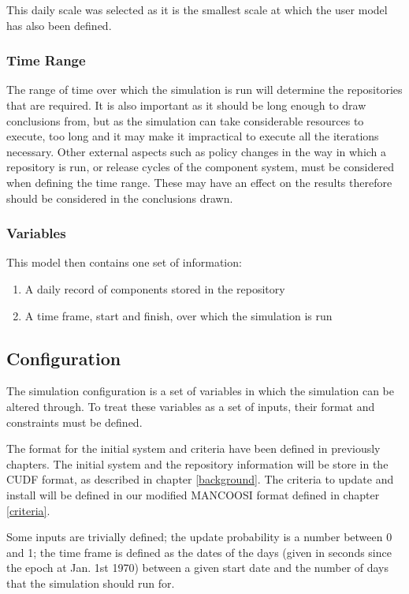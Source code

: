 This daily scale was selected as it is the smallest scale at which the user model has also been defined.

\subsubsection{Time Range}
The range of time over which the simulation is run will determine the repositories that are required.
It is also important as it should be long enough to draw conclusions from,
but as the simulation can take considerable resources to execute, too long and it may make it impractical to execute all the iterations necessary.
Other external aspects such as policy changes in the way in which a repository is run, or release cycles of the component system, 
must be considered when defining the time range.
These may have an effect on the results therefore should be considered in the conclusions drawn.

\subsubsection{Variables}

This model then contains one set of information:
\begin{enumerate}
  \item A daily record of components stored in the repository
  \item A time frame, start and finish, over which the simulation is run
\end{enumerate}

\subsection{Configuration}
The simulation configuration is a set of variables in which the simulation can be altered through.
To treat these variables as a set of inputs, their format and constraints must be defined.

The format for the initial system and criteria have been defined in previously chapters.
The initial system and the repository information will be store in the CUDF format, as described in chapter \ref{background}. 
The criteria to update and install will be defined in our modified MANCOOSI format defined in chapter \ref{criteria}.

Some inputs are trivially defined;
the update probability is a number between 0 and 1;
the time frame is defined as the dates of the days (given in seconds since the epoch at Jan. 1st 1970) between a given start date and the number of days that the simulation should run for.

